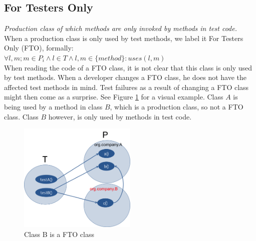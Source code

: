 \subsection{For Testers Only}
\emph{Production class of which methods are only invoked by methods in test code.}\\

When a production class is only used by test methods, we label it For Testers Only (FTO), formally: \\

\begin{math}
\forall l,m; m \in P_i \wedge l \in T \wedge l,m \in \{method\} : uses(l, m)
\end{math} \\

When reading the code of a FTO class, it is not clear that this class is only used by test methods. When a developer changes a FTO class, he does not have the affected test methods in mind. Test failures as a result of changing a FTO class might then come as a surprise. See Figure \ref{fig:FTO} for a visual example. Class $A$ is being used by a method in class $B$, which is a production class, so not a FTO class. Class $B$ however, is only used by methods in test code.

\begin{figure}[!ht]
	
	\centering
	\includegraphics[width=0.5\textwidth]{figures/FTO.png}
	\caption{Class B is a FTO class}
	\label{fig:FTO}
\end{figure}